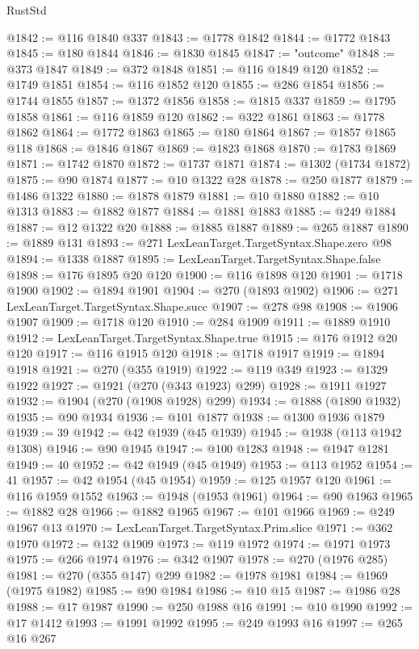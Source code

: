 \begin{lexlean}{RustStd}
\begin{coremodule}
@1842 := @116 @1840 @337
@1843 := @1778 @1842
@1844 := @1772 @1843
@1845 := @180 @1844
@1846 := @1830 @1845
@1847 := "outcome"
@1848 := @373 @1847
@1849 := @372 @1848
@1851 := @116 @1849 @120
@1852 := @1749 @1851
@1854 := @116 @1852 @120
@1855 := @286 @1854
@1856 := @1744 @1855
@1857 := @1372 @1856
@1858 := @1815 @337
@1859 := @1795 @1858
@1861 := @116 @1859 @120
@1862 := @322 @1861
@1863 := @1778 @1862
@1864 := @1772 @1863
@1865 := @180 @1864
@1867 := @1857 @1865 @118
@1868 := @1846 @1867
@1869 := @1823 @1868
@1870 := @1783 @1869
@1871 := @1742 @1870
@1872 := @1737 @1871
@1874 := @1302 (@1734 @1872)
@1875 := @90 @1874
@1877 := @10 @1322 @28
@1878 := @250 @1877
@1879 := @1486 @1322
@1880 := @1878 @1879
@1881 := @10 @1880
@1882 := @10 @1313
@1883 := @1882 @1877
@1884 := @1881 @1883
@1885 := @249 @1884
@1887 := @12 @1322 @20
@1888 := @1885 @1887
@1889 := @265 @1887
@1890 := @1889 @131
@1893 := @271 LexLeanTarget.TargetSyntax.Shape.zero @98
@1894 := @1338 @1887
@1895 := LexLeanTarget.TargetSyntax.Shape.false
@1898 := @176 @1895 @20 @120
@1900 := @116 @1898 @120
@1901 := @1718 @1900
@1902 := @1894 @1901
@1904 := @270 (@1893 @1902)
@1906 := @271 LexLeanTarget.TargetSyntax.Shape.succ
@1907 := @278 @98
@1908 := @1906 @1907
@1909 := @1718 @120
@1910 := @284 @1909
@1911 := @1889 @1910
@1912 := LexLeanTarget.TargetSyntax.Shape.true
@1915 := @176 @1912 @20 @120
@1917 := @116 @1915 @120
@1918 := @1718 @1917
@1919 := @1894 @1918
@1921 := @270 (@355 @1919)
@1922 := @119 @349
@1923 := @1329 @1922
@1927 := @1921 (@270 (@343 @1923) @299)
@1928 := @1911 @1927
@1932 := @1904 (@270 (@1908 @1928) @299)
@1934 := @1888 (@1890 @1932)
@1935 := @90 @1934
@1936 := @101 @1877
@1938 := @1300 @1936 @1879
@1939 := 39
@1942 := @42 @1939 (@45 @1939)
@1945 := @1938 (@113 @1942 @1308)
@1946 := @90 @1945
@1947 := @100 @1283
@1948 := @1947 @1281
@1949 := 40
@1952 := @42 @1949 (@45 @1949)
@1953 := @113 @1952
@1954 := 41
@1957 := @42 @1954 (@45 @1954)
@1959 := @125 @1957 @120
@1961 := @116 @1959 @1552
@1963 := @1948 (@1953 @1961)
@1964 := @90 @1963
@1965 := @1882 @28
@1966 := @1882 @1965
@1967 := @101 @1966
@1969 := @249 @1967 @13
@1970 := LexLeanTarget.TargetSyntax.Prim.slice
@1971 := @362 @1970
@1972 := @132 @1909
@1973 := @119 @1972
@1974 := @1971 @1973
@1975 := @266 @1974
@1976 := @342 @1907
@1978 := @270 (@1976 @285)
@1981 := @270 (@355 @147) @299
@1982 := @1978 @1981
@1984 := @1969 (@1975 @1982)
@1985 := @90 @1984
@1986 := @10 @15
@1987 := @1986 @28
@1988 := @17 @1987
@1990 := @250 @1988 @16
@1991 := @10 @1990
@1992 := @17 @1412
@1993 := @1991 @1992
@1995 := @249 @1993 @16
@1997 := @265 @16 @267

\end{coremodule}
\end{lexlean}
